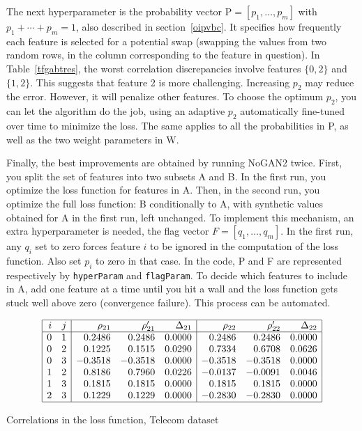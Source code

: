 \documentclass[oneside,10pt]{book}
\renewcommand{\arraystretch}{1.4} %
\begin{document}
The next hyperparameter is the probability vector $\text{P} = [p_1,\dots,p_m]$ with $p_1 + \cdots + p_m =1$,
 also described in section~\ref{oipvbc}. It specifies how frequently
 each feature is selected for a potential swap (swapping the values from two random rows, in the column corresponding to the feature in question).
 In Table~\ref{tfgabtres}, the worst correlation discrepancies involve features $\{0, 2\}$ and $\{1, 2\}$. This suggests that feature 2 is
 more challenging. Increasing $p_2$ may reduce the error. However, it will penalize other features. To choose the optimum $p_2$, you can let the algorithm do the job, using an adaptive $p_2$ automatically fine-tuned over time to minimize the loss. The same applies to all the probabilities in P, as well as the
 two weight parameters in W.

Finally, the best improvements are obtained by running NoGAN2 twice. First, you split the set of features into two subsets A and B. In the first run,
 you optimize the loss function for features in A. Then, in the second run, you optimize the full loss function: B conditionally to A, with synthetic values obtained for A in the first run, left unchanged. To implement this mechanism, an extra hyperparameter is needed, the flag vector
 $F = [q_1,\dots,q_m]$. In the first run, any $q_i$ set to zero forces feature $i$ to be ignored in the computation of the loss function. Also set $p_i$ to zero in that case.
 In the code, P and F are represented respectively by \texttt{hyperParam} and \texttt{flagParam}. To decide which features to include in A, add one feature at a time until you hit a wall and the loss function gets stuck well above zero (convergence failure).  This process can be automated.

\begin{table}[H]
\small
\[
\begin{array}{|rr|rrr|rrr|}
\hline
i	&  j &  \rho_{21} & \rho'_{21}& \Delta_{21} & \rho_{22}& \rho'_{22} & \Delta_{22}\\
\hline
0&1&0.2486&0.2486&0.0000&0.2486&0.2486&0.0000\\
0&2&0.1225&0.1515&0.0290&0.7334&0.6708&0.0626\\
0&3&-0.3518&-0.3518&0.0000&-0.3518&-0.3518&0.0000\\
1&2&0.8186&0.7960&0.0226&-0.0137&-0.0091&0.0046\\
1&3&0.1815&0.1815&0.0000&0.1815&0.1815&0.0000\\
2&3&0.1229&0.1229&0.0000&-0.2830&-0.2830&0.0000\\
\hline
\end{array}
\]
\caption{\label{tfgabtres} Correlations in the loss function, Telecom dataset}
\end{table}
\end{document}
